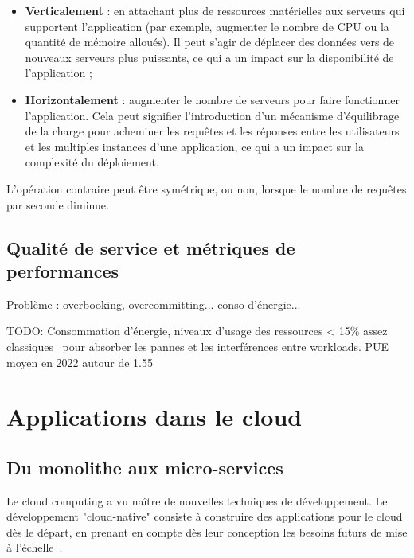 \begin{itemize}
    \item \textbf{Verticalement} : en attachant plus de ressources matérielles aux serveurs qui supportent l'application (par exemple, augmenter le nombre de CPU ou la quantité de mémoire alloués). Il peut s'agir de déplacer des données vers de nouveaux serveurs plus puissants, ce qui a un impact sur la disponibilité de l'application ;
    \item \textbf{Horizontalement} : augmenter le nombre de serveurs pour faire fonctionner l'application. Cela peut signifier l'introduction d'un mécanisme d'équilibrage de la charge pour acheminer les requêtes et les réponses entre les utilisateurs et les multiples instances d'une application, ce qui a un impact sur la complexité du déploiement.
\end{itemize}

L'opération contraire peut être symétrique, ou non, lorsque le nombre de requêtes par seconde diminue.

\subsection{Qualité de service et métriques de performances}

Problème : overbooking, overcommitting... conso d'énergie...

TODO: Consommation d'énergie, niveaux d'usage des ressources < 15\% assez classiques~\cite{vasanWorthTheirWatts2010, vermaLargescaleClusterManagement2015a} pour absorber les pannes et les interférences entre workloads. PUE moyen en 2022 autour de 1.55~\cite{davisUptimeInstituteGlobal2022}

\section{Applications dans le cloud}

\subsection{Du monolithe aux micro-services}

Le cloud computing a vu naître de nouvelles techniques de développement. Le développement "cloud-native" consiste à construire des applications pour le cloud dès le départ, en prenant en compte dès leur conception les besoins futurs de mise à l'échelle~\cite{dragoniMicroservicesHowMake2018, martinfowler2014microservices}.

